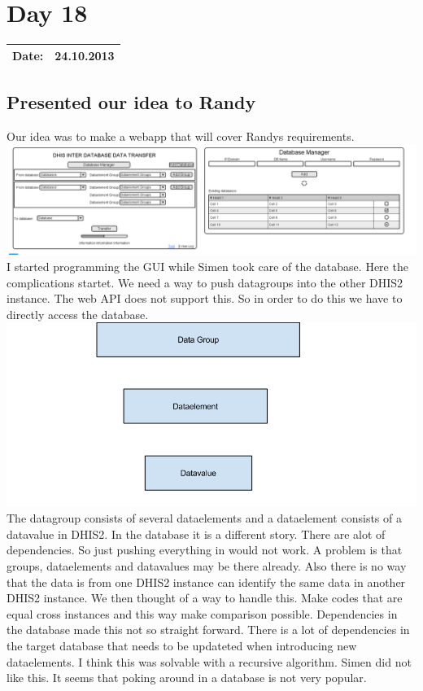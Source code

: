 \section{Day 18}
\begin{tabular}{|c|c|}
\hline
Date: & 24.10.2013 \\
\hline
\end{tabular}
\subsection{Presented our idea to Randy}
Our idea was to make a webapp that will cover Randys requirements.\\
\includegraphics[width="15cm"]{appendix/images/mockup}
I started programming the GUI while Simen took care of the database.
Here the complications startet. We need a way to push datagroups into the other DHIS2 instance.
The web API does not support this.
So in order to do this we have to directly access the database. 
\includegraphics[width="15cm"]{appendix/images/datagroup}
The datagroup consists of several dataelements and a dataelement consists of a datavalue in DHIS2.
In the database it is a different story. There are alot of dependencies. So just pushing everything in would not work.
A problem is that groups, dataelements and datavalues may be there already. Also there is no way that the data is from one DHIS2 instance can identify the same data in another DHIS2 instance. We then thought of a way to handle this. 
Make codes that are equal cross instances and this way make comparison possible.
Dependencies in the database made this not so straight forward. There is a lot of dependencies in the target database that needs to be updateted when introducing new dataelements. I think this was solvable with a recursive algorithm. Simen did not like this. It seems that poking around in a database is not very popular. 
